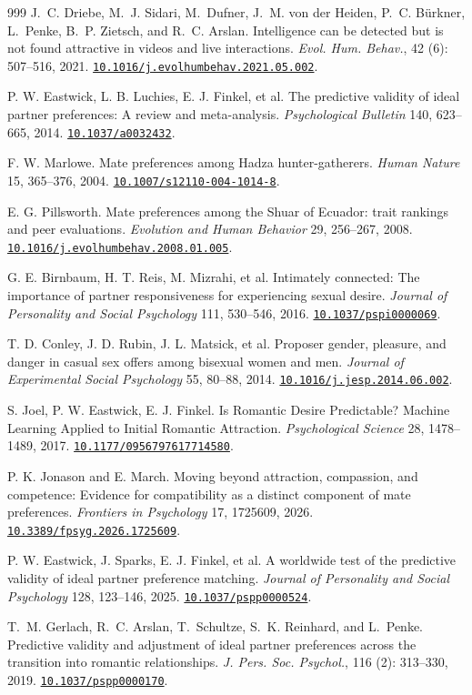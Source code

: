 \documentclass[10pt,twocolumn,letterpaper]{article}
\newcommand{\doi}[1]{\href{https://doi.org/#1}{\nolinkurl{#1}}}
\begin{document}
\begin{thebibliography}{999}
 J.~C. {Driebe}, M.~J. {Sidari}, M.~{Dufner}, J.~M. {von der Heiden}, P.~C. {Bürkner}, L.~{Penke}, B.~P. {Zietsch}, and R.~C. {Arslan}. {Intelligence can be detected but is not found attractive in videos and live interactions}. \emph{Evol. Hum. Behav.}, 42 (6): 507--516, 2021. \doi{10.1016/j.evolhumbehav.2021.05.002}.

 P. W. Eastwick, L. B. Luchies, E. J. Finkel, et al. The predictive validity of ideal partner preferences: A review and meta-analysis. \emph{Psychological Bulletin} 140, 623--665, 2014. \doi{10.1037/a0032432}.

 F. W. Marlowe. Mate preferences among Hadza hunter-gatherers. \emph{Human Nature} 15, 365--376, 2004. \doi{10.1007/s12110-004-1014-8}.

 E. G. Pillsworth. Mate preferences among the Shuar of Ecuador: trait rankings and peer evaluations. \emph{Evolution and Human Behavior} 29, 256--267, 2008. \doi{10.1016/j.evolhumbehav.2008.01.005}.

 G. E. Birnbaum, H. T. Reis, M. Mizrahi, et al. Intimately connected: The importance of partner responsiveness for experiencing sexual desire. \emph{Journal of Personality and Social Psychology} 111, 530--546, 2016. \doi{10.1037/pspi0000069}.

 T. D. Conley, J. D. Rubin, J. L. Matsick, et al. Proposer gender, pleasure, and danger in casual sex offers among bisexual women and men. \emph{Journal of Experimental Social Psychology} 55, 80--88, 2014. \doi{10.1016/j.jesp.2014.06.002}.

 S. Joel, P. W. Eastwick, E. J. Finkel. Is Romantic Desire Predictable? Machine Learning Applied to Initial Romantic Attraction. \emph{Psychological Science} 28, 1478--1489, 2017. \doi{10.1177/0956797617714580}.

 P. K. Jonason and E. March. Moving beyond attraction, compassion, and competence: Evidence for compatibility as a distinct component of mate preferences. \emph{Frontiers in Psychology} 17, 1725609, 2026. \doi{10.3389/fpsyg.2026.1725609}.

 P. W. Eastwick, J. Sparks, E. J. Finkel, et al. A worldwide test of the predictive validity of ideal partner preference matching. \emph{Journal of Personality and Social Psychology} 128, 123--146, 2025. \doi{10.1037/pspp0000524}.

 T.~M. {Gerlach}, R.~C. {Arslan}, T.~{Schultze}, S.~K. {Reinhard}, and L.~{Penke}. {Predictive validity and adjustment of ideal partner preferences across the transition into romantic relationships.} \emph{J. Pers. Soc. Psychol.}, 116 (2): 313--330, 2019. \doi{10.1037/pspp0000170}.


\end{thebibliography}
\end{document}
